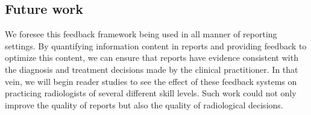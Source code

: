 \subsection{Future work}
We foresee this feedback framework being used in all manner of reporting settings. By quantifying information content in reports and providing feedback to optimize this content, we can ensure that reports have evidence consistent with the diagnosis and treatment decisions made by the clinical practitioner. In that vein, we will begin reader studies to see the effect of these feedback systems on practicing radiologists of several different skill levels. Such work could not only improve the quality of reports but also the quality of radiological decisions.
 
 



 
